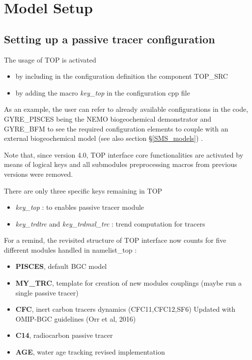\documentclass[../main/TOP_manual]{subfiles}
\begin{document}
\chapter{ Model Setup}

\section{ Setting up a passive tracer configuration}

The usage of TOP is activated

\begin{itemize}
         \item by including in the configuration definition the component TOP\_SRC
         \item by adding the macro \textit{key\_top} in the configuration cpp file
\end{itemize}

As an example, the user can refer to already available configurations in the code, GYRE\_PISCES being the NEMO biogeochemical demonstrator and GYRE\_BFM to see the required configuration elements to couple with an external biogeochemical model (see also section \S\ref{SMS_models}) .

Note that, since version 4.0, TOP interface core functionalities are activated by means of logical keys and all submodules preprocessing macros from previous versions were removed.

There are only three specific keys remaining in TOP

\begin{itemize}
        \item \textit{key\_top} : to enables passive tracer module
        \item \textit{key\_trdtrc} and \textit{key\_trdmxl\_trc} : trend computation for tracers
\end{itemize}

For a remind, the revisited structure of TOP interface now counts for five different modules handled in namelist\_top :

\begin{itemize}
        \item \textbf{PISCES}, default BGC model
        \item \textbf{MY\_TRC}, template for creation of new modules couplings (maybe run a single passive tracer)
        \item \textbf{CFC}, inert carbon tracers dynamics (CFC11,CFC12,SF6) Updated with OMIP-BGC guidelines (Orr et al, 2016)
        \item \textbf{C14}, radiocarbon passive tracer
        \item \textbf{AGE}, water age tracking revised implementation
\end{itemize}
\end{document}
